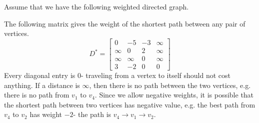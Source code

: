 \documentclass[a4paper, openany]{memoir}
\begin{document}
    Assume that we have the following weighted directed graph.
    \begin{figure}[H]
        \centering
    \end{figure}
    \noindent The following matrix gives the weight of the shortest path between any pair of vertices.
    \[D^* = \begin{bmatrix}
        0 & -5 & -3 & \infty \\
        \infty & 0 & 2 & \infty \\
        \infty & \infty & 0 & \infty \\
        3 & -2 & 0  & 0
    \end{bmatrix}\]
    Every diagonal entry is 0- traveling from a vertex to itself should not cost anything. If a distance is $\infty$, then there is no path between the two vertices, e.g. there is no path from $v_1$ to $v_4$. Since we allow negative weights, it is possible that the shortest path between two vertices has negative value, e.g. the best path from $v_4$ to $v_2$ has weight $-2$- the path is $v_4 \to v_1 \to v_2$.
\end{document}
